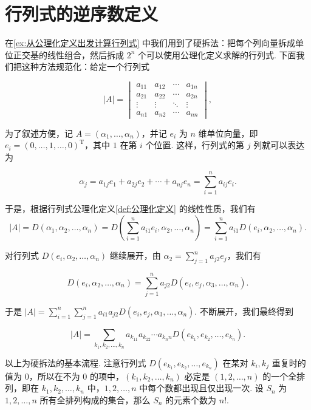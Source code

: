 \section{行列式的逆序数定义}\label{sec:行列式的逆序数定义}

在\autoref{ex:从公理化定义出发计算行列式} 中我们用到了硬拆法：把每个列向量拆成单位正交基的线性组合，然后拆成 $2^n$ 个可以使用公理化定义求解的行列式. 下面我们把这种方法规范化：给定一个行列式

\[|A| = \begin{vmatrix}
        a_{11} & a_{12} & \cdots & a_{1n} \\
        a_{21} & a_{22} & \cdots & a_{2n} \\
        \vdots & \vdots & \ddots & \vdots \\
        a_{n1} & a_{n2} & \cdots & a_{nn}
    \end{vmatrix},\]

为了叙述方便，记 $A = (\alpha_1,\ldots,\alpha_n)$，并记 $e_i$ 为 $n$ 维单位向量，即 $e_i = (0,\ldots,1,\ldots,0)^\mathrm{T}$，其中 $1$ 在第 $i$ 个位置. 这样，行列式的第 $j$ 列就可以表达为

\[\alpha_j = a_{1j}e_1 + a_{2j}e_2 + \cdots + a_{nj}e_n = \sum_{i=1}^{n}a_{ij}e_i.\]

于是，根据行列式公理化定义\autoref{def:公理化定义} 的线性性质，我们有
\[
    |A| = D(\alpha_1,\alpha_2,\ldots,\alpha_n) = D\left(\sum\limits_{i=1}^{n}a_{i1}e_i,\alpha_2,\ldots,\alpha_n\right) = \sum\limits_{i=1}^{n}a_{i1}D(e_i,\alpha_2,\ldots,\alpha_n).
\]

对行列式 $D(e_i,\alpha_2,\ldots,\alpha_n)$ 继续展开，由 $\alpha_2 = \sum\limits_{j=1}^{n}a_{j2}e_j$，我们有

\[D(e_i,\alpha_2,\ldots,\alpha_n) = \sum\limits_{j=1}^{n}a_{j2}D(e_i,e_j,\alpha_3,\ldots,\alpha_n).\]

于是 $|A| = \sum\limits_{i=1}^{n}\sum\limits_{j=1}^{n}a_{i1}a_{j2}D(e_i,e_j,\alpha_3,\ldots,\alpha_n)$. 不断展开，我们最终得到

\[|A| = \sum\limits_{k_1,k_2,\ldots,k_n} a_{k_11}a_{k_22}\cdots a_{k_nn}D(e_{k_1},e_{k_2},\ldots,e_{k_n}).\]

以上为硬拆法的基本流程. 注意行列式 $D(e_{k_1},e_{k_2},\ldots,e_{k_n})$ 在某对 $k_i,k_j$ 重复时的值为 $0$，所以在不为 $0$ 的项中，$(k_1,k_2,\ldots,k_n)$ 必定是 $(1,2,\ldots,n)$ 的一个全排列，即在 $k_1,k_2,\ldots,k_n$ 中，$1,2,\ldots,n$ 中每个数都出现且仅出现一次. 设 $S_n$ 为 $1,2,\ldots,n$ 所有全排列构成的集合，那么 $S_n$ 的元素个数为 $n!$.

